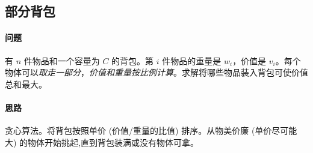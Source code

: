 \subsection{部分背包}
	\paragraph{问题} 有 $n$ 件物品和一个容量为 $C$ 的背包。第 $i$ 件物品的重量是 $w_i$，价值是 $v_i$。每个物体可以\emph{取走一部分}，\emph{价值和重量按比例计算}。求解将哪些物品装入背包可使价值总和最大。

	\paragraph{思路} 贪心算法。将背包按照单价 (价值/重量的比值) 排序。从物美价廉 (单价尽可能大) 的物体开始挑起,直到背包装满或没有物体可拿。